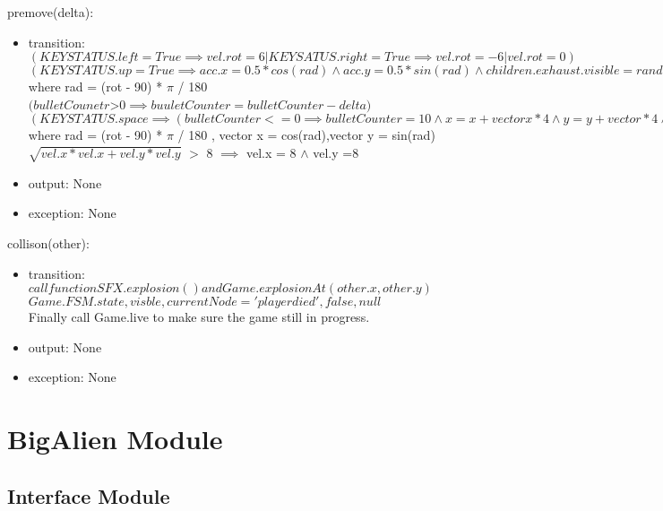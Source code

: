 \documentclass[12pt]{article}
\begin{document}
\noindent premove(delta):
\begin{itemize}
\item transition: $(KEYSTATUS.left = True \implies vel.rot = 6 | KEYSATUS.right = True \implies vel.rot = -6 | vel.rot = 0)$\\
$(KEYSTATUS.up = True \implies acc.x = 0.5*cos(rad) \wedge acc.y = 0.5 * sin(rad) \wedge children.exhaust.visible = random() > 0.1| acc.x = 0 \wedge acc.y = 0 \wedge children.exhuast.visible = False)$\\
where rad = (rot - 90) * $\pi$ / 180\\
$(bulletCounetr $>$ 0 \implies buuletCounter = bulletCounter - delta)$\\
$(KEYSTATUS.space \implies(bulletCounter <=0 \implies bulletCounter = 10 \wedge x = x + vectorx *4 \wedge y = y + vector * 4 \wedge vel.x = 6 * vectorx + vel.x \wedge vel.y = 6*vertory + vel.y \wedge visible = True ))$\\
where rad = (rot - 90) * $\pi$ / 180 , vector x = cos(rad),vector y = sin(rad)\\
$\sqrt{vel.x * vel.x + vel.y * vel.y}$ $>$ 8 $\implies$ vel.x = 8 $\wedge$ vel.y =8\\
\item output: None
\item exception: None
\end{itemize}

\noindent collison(other):
\begin{itemize}
\item transition: $call function SFX.explosion() and Game.explosionAt(other.x,other.y)$\\
$Game.FSM.state, visble,currentNode = 'playerdied' , false, null$\\
Finally call Game.live to make sure the game still in progress.\\
\item output: None
\item exception: None
\end{itemize}

\newpage

\section* {BigAlien Module}

\subsection*{Interface Module}
\end{document}
